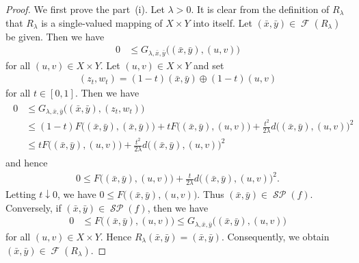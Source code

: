 \documentclass[draft]{amsart}
\numberwithin{equation}{section}
\DeclareMathOperator{\Fix}{\mathcal{F}}
\DeclareMathOperator{\Saddle}{\mathcal{SP}}
\theoremstyle{plain}
\theoremstyle{definition}
\theoremstyle{remark}
\begin{document}
\begin{proof}
 We first prove the part~(i). 
 Let $\lambda>0$. It is clear from the definition of $R_{\lambda}$ that 
 $R_{\lambda}$ is a single-valued mapping of $X\times Y$ 
 into itself. Let $(\bar{x},\bar{y})\in \Fix(R_{\lambda})$ be given. 
 Then we have 
 \begin{align}
  0&\leq G_{\lambda, \bar{x},\bar{y}}\bigl((\bar{x},\bar{y}),(u,v)\bigr)
 \end{align}
 for all $(u,v)\in X\times Y$. Let $(u,v)\in X\times Y$ and 
 set 
 \begin{align}
  (z_t,w_t) = (1-t)(\bar{x},\bar{y}) \oplus (1-t)(u,v)
 \end{align}
 for all $t\in [0,1]$. Then we have 
 \begin{align}
\begin{split}
  0
&\leq G_{\lambda, \bar{x},\bar{y}}\bigl((\bar{x},\bar{y}),(z_t,w_t)\bigr) \\
&\leq (1-t)F\bigl((\bar{x},\bar{y}),(\bar{x},\bar{y})\bigr) 
+tF\bigl((\bar{x},\bar{y}),(u,v)\bigr) 
 +\frac{t^2}{2\lambda}d\bigl((\bar{x},\bar{y}), (u,v)\bigr)^2 \\
&\leq tF\bigl((\bar{x},\bar{y}),(u,v)\bigr) 
 +\frac{t^2}{2\lambda}d\bigl((\bar{x},\bar{y}), (u,v)\bigr)^2 
\end{split}
 \end{align} 
 and hence 
 \begin{align}
  0\leq F\bigl((\bar{x},\bar{y}),(u,v)\bigr) 
 +\frac{t}{2\lambda}d\bigl((\bar{x},\bar{y}), (u,v)\bigr)^2. 
 \end{align}
 Letting $t\downarrow 0$, we have 
 $0\leq F\bigl((\bar{x},\bar{y}),(u,v)\bigr)$. Thus $(\bar{x},\bar{y})\in \Saddle(f)$. 
 Conversely, if $(\bar{x},\bar{y})\in \Saddle(f)$, then we have 
 \begin{align}
  0
 &\leq F\bigl((\bar{x},\bar{y}),(u,v)\bigr) 
 \leq G_{\lambda, \bar{x},\bar{y}}\bigl((\bar{x},\bar{y}),(u,v)\bigr)
 \end{align}
 for all $(u,v)\in X\times Y$. Hence $R_{\lambda}(\bar{x},\bar{y})=(\bar{x},\bar{y})$. 
 Consequently, we obtain $(\bar{x},\bar{y})\in \Fix(R_{\lambda})$. 


\end{proof}
\end{document}
